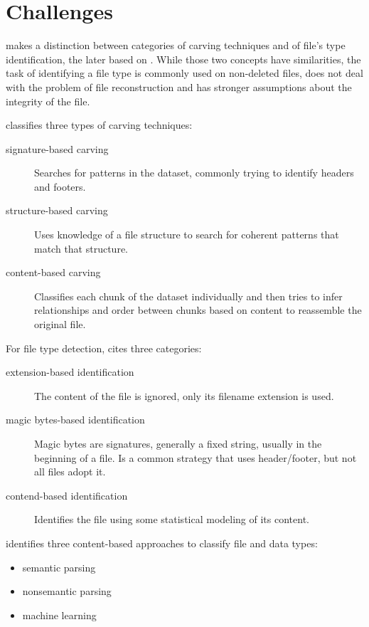 \section{Challenges}

\cite{ali_review_2018} makes a distinction between categories of carving techniques and of file's type identification, the later based on \cite{amirani_new_2008}. While those two concepts have similarities, the task of identifying a file type is commonly used on non-deleted files, does not deal with the problem of file reconstruction and has stronger assumptions about the integrity of the file.

\cite{ali_review_2018} classifies three types of carving techniques:
\begin{description}
    \item [signature-based carving] Searches for patterns in the dataset, commonly trying to identify headers and footers.
    \item [structure-based carving] Uses knowledge of a file structure to search for coherent patterns that match that structure.
    \item [content-based carving] Classifies each chunk of the dataset individually and then tries to infer relationships and order between chunks based on content to reassemble the original file.
\end{description}

For file type detection, \cite{amirani_new_2008} cites three categories:
\begin{description}
    \item [extension-based identification] The content of the file is ignored, only its filename extension is used.
    \item [magic bytes-based identification] Magic bytes are signatures, generally a fixed string, usually in the beginning of a file. Is a common strategy that uses header/footer, but not all files adopt it.
    \item [contend-based identification] Identifies the file using some statistical modeling of its content. 
\end{description}

\cite{beebe_sceadan:_2013} identifies three content-based approaches to classify file and data types:
\begin{itemize}
    \item semantic parsing
    \item nonsemantic parsing
    \item machine learning
\end{itemize}

